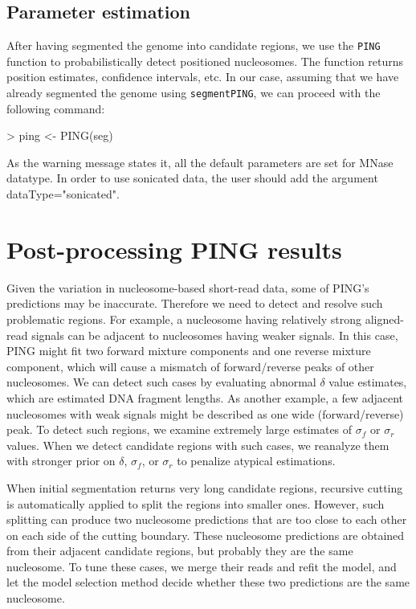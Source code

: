 \documentclass[11pt]{article}
\begin{document}
\subsection{Parameter estimation}
After having segmented the genome into candidate regions, we use the \texttt{PING} function to probabilistically detect positioned nucleosomes.
The function returns position estimates, confidence intervals, etc. In our case, assuming that we have already segmented the genome using \texttt{segmentPING}, we can proceed with the following command: 

\begin{Schunk}
\begin{Sinput}
> ping <- PING(seg)
\end{Sinput}
\end{Schunk}

As the warning message states it, all the default parameters are set for MNase datatype. In order to use sonicated data, the user should add the argument dataType="sonicated".


\section{Post-processing PING results}
Given the variation in nucleosome-based short-read data, some of PING's predictions may be inaccurate. Therefore we need to detect and resolve such problematic regions. 
For example, a nucleosome having relatively strong aligned-read signals can be adjacent to nucleosomes having weaker signals. In this case, PING might fit two forward mixture components and one reverse mixture component, which will cause a mismatch of forward/reverse peaks of other nucleosomes. We can detect such cases by evaluating abnormal $\delta$ value estimates, which are estimated DNA fragment lengths. 
As another example, a few adjacent nucleosomes with weak signals might be described as one wide (forward/reverse) peak. To detect such regions, we examine extremely large estimates of $\sigma_f$ or $\sigma_r$ values. When we detect candidate regions with such cases, we reanalyze them with stronger prior on $\delta$,  $\sigma_f$, or $\sigma_r$ to penalize atypical estimations.

When initial segmentation returns very long candidate regions, recursive cutting is automatically applied to split the regions into smaller ones. However, such splitting can produce two nucleosome predictions that are too close to each other on each side of the cutting boundary. These nucleosome predictions are obtained from their adjacent candidate regions, but probably they are the same nucleosome. To tune these cases, we merge their reads and refit the model, and let the model selection method decide whether these two predictions are the same nucleosome.
\end{document}

